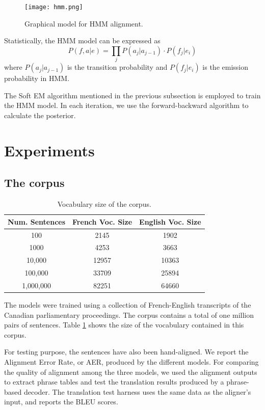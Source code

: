 \documentclass[12pt]{article}   %
\begin{document}
\begin{figure}[h*]
	\centering
	\texttt{[image: hmm.png]}
	\label{fig:hmm}
	\caption{Graphical model for HMM alignment.}
\end{figure}

Statistically, the HMM model can be expressed as
$$ P(f,a|e) = \prod_j P(a_j|a_{j-1}) \cdot P(f_j|e_i) $$
where $P(a_j|a_{j-1})$ is the transition probability and $P(f_j|e_i)$ is the emission probability in HMM.

The Soft EM algorithm mentioned in the previous subsection is employed to train the HMM model. In each iteration, we use the forward-backward algorithm \cite{forward-backward} to calculate the posterior.


\section{Experiments}
\label{sec:exp}


\subsection{The corpus}

\begin{table}
\centering
\begin{tabular}{ c | c | c  }
	Num. Sentences & French Voc. Size & English Voc. Size \\
	\hline
	100 & 2145 & 1902 \\
	1000 & 4253 & 3663 \\
	10,000 & 12957 & 10363 \\
	100,000 & 33709 & 25894 \\
	1,000,000 & 82251 & 64660 \\
\end{tabular}
\caption{Vocabulary size of the corpus.}
\label{tbl:corpus}
\end{table}

The models were trained using a collection of French-English transcripts of the Canadian parliamentary proceedings. The corpus contains a total of one million pairs of sentences. Table \ref{tbl:corpus} shows the size of the vocabulary contained in this corpus.

For testing purpose, the sentences have also been hand-aligned. We report the Alignment Error Rate, or AER, produced by the different models. For comparing the quality of alignment among the three models, we used the alignment outputs to extract phrase tables and test the translation results produced by a phrase-based decoder. The translation test harness uses the same data as the aligner's input, and reports the BLEU scores.
\end{document}
